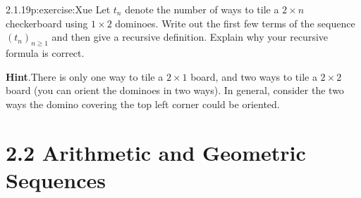 \documentclass[twoside,11pt,]{book}
\newcommand{\blocktitlefont}{\relax}
\numberwithin{equation}{chapter}
\begin{document}
\begin{divisionsolution}{2.1.19}{}{p:exercise:Xue}%
Let \(t_n\) denote the number of ways to tile a \(2\times n\) checkerboard using \(1\times 2\) dominoes.  Write out the first few terms of the sequence \((t_n)_{n \ge 1}\) and then give a recursive definition.  Explain why your recursive formula is correct.%
\par\smallskip%
\noindent\textbf{\blocktitlefont Hint}.\quad{}There is only one way to tile a \(2 \times 1\) board, and two ways to tile a \(2\times 2\) board (you can orient the dominoes in two ways).  In general, consider the two ways the domino covering the top left corner could be oriented.%
\end{divisionsolution}%
\section*{2.2 Arithmetic and Geometric Sequences}
\end{document}
